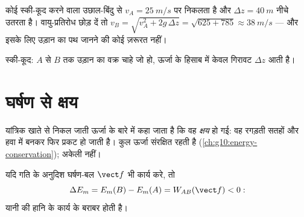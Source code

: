 \begin{example}[स्की-कूद में उतरने की चाल]\label{ex:g11:mechanical-energy:skijump}
कोई स्की-कूद करने वाला उछाल-बिंदु से $v_A = \qty{25}{m/s}$ पर निकलता है और $\Delta z = \qty{40}{m}$ नीचे
उतरता है। वायु-प्रतिरोध छोड़ दें तो $v_B = \sqrt{v_A^2 + 2g\,\Delta z} = \sqrt{625 + 785} \approx
\qty{38}{m/s}$ --- और इसके लिए उड़ान का पथ जानने
की कोई ज़रूरत नहीं।
\end{example}

\begin{omfigure}

{\small स्की-कूद: $A$ से $B$ तक उड़ान का वक्र चाहे जो हो,
ऊर्जा के हिसाब में केवल गिरावट $\Delta z$ आती है।}
\end{omfigure}

\section{घर्षण से क्षय}

\begin{definition}[क्षय]\label{def:g11:mechanical-energy:dissipation}
यांत्रिक खाते से निकल जाती ऊर्जा के बारे में कहा जाता है कि वह
\emph{क्षय} हो गई: वह रगड़ती सतहों और हवा में  बनकर फिर प्रकट हो जाती है। कुल ऊर्जा संरक्षित रहती है
(\cref{ch:g10:energy-conservation}); अकेली  नहीं।
\end{definition}

\begin{proposition}[घाटा घर्षण को नाप देता है]\label{prop:g11:mechanical-energy:deficit}
यदि गति के अनुदिश घर्षण-बल $\vect f$ भी कार्य करे,
तो
\[
\Delta E_m = E_m(B) - E_m(A) = W_{AB}(\vect f) < 0:
\]
यानी  की हानि  के कार्य के
बराबर होती है।
\end{proposition}

